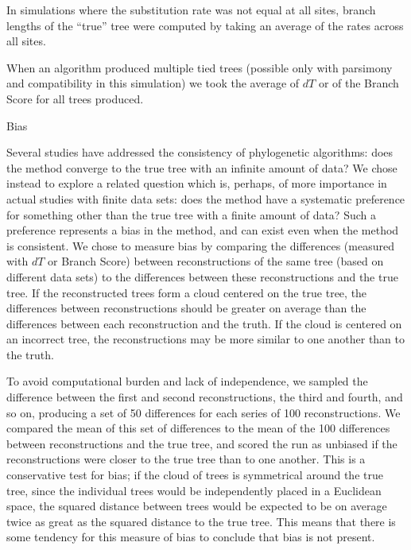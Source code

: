 	In simulations where the substitution rate was not equal at all 
sites, branch lengths of the ``true'' tree were computed by taking an 
average of the rates across all sites.

When an algorithm produced multiple tied trees (possible only with
parsimony and compatibility in this simulation) we took the average of
$dT$ or of the Branch Score for all trees produced.


\bigskip

\bigskip

\noindent
Bias
\bigskip


Several studies have addressed the consistency of phylogenetic
algorithms:  does the method converge to the true tree with
an infinite amount of data?  We chose instead to explore a related
question which is, perhaps, of more importance in actual studies with
finite data sets:  does the method have a systematic preference for
something other than the true tree with a finite amount of data?
Such a preference represents a bias in the method, and can exist even
when the method is consistent.  We chose to measure bias by
comparing the differences (measured with $dT$ or Branch Score) between 
reconstructions of the same tree (based 
on different data sets) to the differences between these reconstructions
and the true tree.  If the reconstructed trees form a cloud centered on 
the true tree, the differences between reconstructions should be greater 
on average than the differences between each reconstruction and the 
truth.  If the cloud is centered on an incorrect tree, the reconstructions
may be more similar to one another than to the truth.
	
To avoid computational burden and lack of independence, we 
sampled the difference between the first and second reconstructions, the 
third and fourth, and so on, producing a set of 50 differences for 
each series of 100 reconstructions.  We compared the mean of this set of differences
to the mean of the 100 differences between reconstructions and the true 
tree, and scored the run as unbiased if the reconstructions were closer 
to the true tree than to one another.  This is a conservative test for 
bias; if the cloud of trees is symmetrical around the true tree,
since the individual trees would be independently placed in a Euclidean
space, the squared distance between trees would be expected to be on
average twice as great as the squared distance to the true tree.  This
means that there is some tendency for this measure of bias to
conclude that bias is not present.

